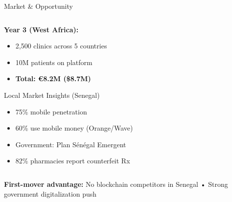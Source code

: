 \documentclass[aspectratio=169,xcolor=dvipsnames,20pt]{beamer}
\newcommand{\checkitem}{\item[\color{SuccessGreen}\faCheckCircle]}
\begin{document}
\begin{frame}{Market \& Opportunity}
\begin{columns}[T]
\begin{column}{0.5\textwidth}
      \vspace{0.2cm}

      \textbf{Year 3 (West Africa):}
      \begin{itemize}
        \item 2,500 clinics across 5 countries
        \item 10M patients on platform
        \item \textbf{Total: €8.2M (\$8.7M)}
      \end{itemize}

      \vspace{0.3cm}

      \begin{block}{Local Market Insights (Senegal)}
        \begin{itemize}
          \checkitem 75\% mobile penetration
          \checkitem 60\% use mobile money (Orange/Wave)
          \checkitem Government: Plan Sénégal Emergent
          \checkitem 82\% pharmacies report counterfeit Rx
        \end{itemize}
      \end{block}
    \end{column}
  \end{columns}

  \vspace{0.3cm}

  \begin{center}
    \textbf{First-mover advantage:} No blockchain competitors in Senegal • Strong government digitalization push
  \end{center}

\end{frame}
\end{document}
